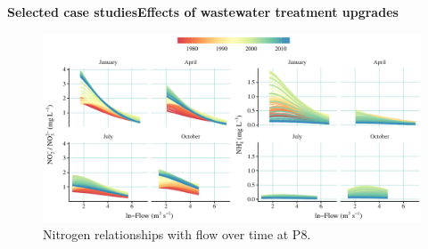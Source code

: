 \documentclass[serif]{beamer}\usepackage[]{graphicx}\usepackage[]{color}
\begin{document}
\begin{frame}{\textbf{Selected case studies}}{\textbf{Effects of wastewater treatment upgrades}}
\vspace{0.1in}
\begin{figure}
\centerline{\includegraphics[width = \textwidth]{fig/p8dyna.pdf}}
\caption{Nitrogen relationships with flow over time at P8.}
\end{figure}
\end{frame}
\end{document}

